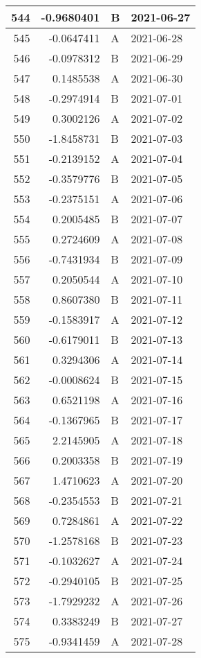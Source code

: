 \begin{tabular}{r|r|l|l}
\hline
544 & -0.9680401 & B & 2021-06-27\\
\hline
545 & -0.0647411 & A & 2021-06-28\\
\hline
546 & -0.0978312 & B & 2021-06-29\\
\hline
547 & 0.1485538 & A & 2021-06-30\\
\hline
548 & -0.2974914 & B & 2021-07-01\\
\hline
549 & 0.3002126 & A & 2021-07-02\\
\hline
550 & -1.8458731 & B & 2021-07-03\\
\hline
551 & -0.2139152 & A & 2021-07-04\\
\hline
552 & -0.3579776 & B & 2021-07-05\\
\hline
553 & -0.2375151 & A & 2021-07-06\\
\hline
554 & 0.2005485 & B & 2021-07-07\\
\hline
555 & 0.2724609 & A & 2021-07-08\\
\hline
556 & -0.7431934 & B & 2021-07-09\\
\hline
557 & 0.2050544 & A & 2021-07-10\\
\hline
558 & 0.8607380 & B & 2021-07-11\\
\hline
559 & -0.1583917 & A & 2021-07-12\\
\hline
560 & -0.6179011 & B & 2021-07-13\\
\hline
561 & 0.3294306 & A & 2021-07-14\\
\hline
562 & -0.0008624 & B & 2021-07-15\\
\hline
563 & 0.6521198 & A & 2021-07-16\\
\hline
564 & -0.1367965 & B & 2021-07-17\\
\hline
565 & 2.2145905 & A & 2021-07-18\\
\hline
566 & 0.2003358 & B & 2021-07-19\\
\hline
567 & 1.4710623 & A & 2021-07-20\\
\hline
568 & -0.2354553 & B & 2021-07-21\\
\hline
569 & 0.7284861 & A & 2021-07-22\\
\hline
570 & -1.2578168 & B & 2021-07-23\\
\hline
571 & -0.1032627 & A & 2021-07-24\\
\hline
572 & -0.2940105 & B & 2021-07-25\\
\hline
573 & -1.7929232 & A & 2021-07-26\\
\hline
574 & 0.3383249 & B & 2021-07-27\\
\hline
575 & -0.9341459 & A & 2021-07-28\\

\end{tabular}
